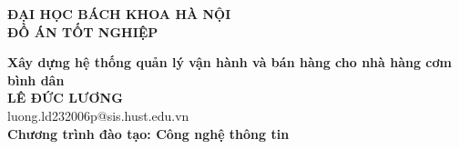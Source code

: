 \documentclass[20232006p.tex]{subfiles}
\begin{document}
\begin{titlepage}
  \thispagestyle{empty}
  \begin{center}

    {\textbf{\large{ĐẠI HỌC BÁCH KHOA HÀ NỘI}}}\\[4cm]

    {\textbf{\huge{ĐỒ ÁN TỐT NGHIỆP}}}\\[1cm]
    {\textbf{\Large{Xây dựng hệ thống quản lý vận hành và bán hàng cho nhà hàng cơm bình dân}}\\[1cm]

    {\textbf{\large{LÊ ĐỨC LƯƠNG}}}\\
    {\large{luong.ld232006p@sis.hust.edu.vn}}\\[0.5cm]

    {\textbf{\large{Chương trình đào tạo: Công nghệ thông tin
      }}}\\

    \vfill
    \begin{table}[H]
      \centering
    \end{table}}
  \end{center}



\end{titlepage}
\end{document}
